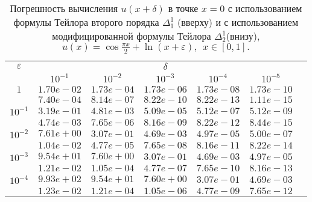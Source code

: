 \documentclass[10pt,twoside]{uz_kgu}
\begin{document}
\newpage
\begin{table} [!htb]
		\caption {Погрешность вычисления $u(x+ \delta)$ в точке $x=0$ с использованием формулы Тейлора второго порядка $\Delta_1^1$ (вверху) и с использованием модифицированной формулы Тейлора $\Delta_2^1$(внизу),
		$u(x)=  \cos \frac{\pi x}{2} + \ln{(x+\varepsilon)} ,\ \    x\in [0,1].$}
	\begin{center}
		\begin{tabular}{|c|c|c|c|c|c|c}
			\cline{1-6} $\varepsilon$ & \multicolumn{5}{c|}{$\delta$} \\
			\cline{2-6} &$10^{-1}$ & $10^{-2}$ & $10^{-3}$  & $10^{-4}$& $10^{-5}$\\
			\cline{1-6}
			$1$
			&$1.70e-02$&$1.73e-04$&$1.73e-06$&$1.73e-08$& $1.73e-10$\\
			&$7.40e-04$&$8.14e-07$&$8.22e-10$&$8.22e-13$& $1.11e-15$\\
			\cline{1-6}
			$10^{-1}$
			&$3.19e-01$&$4.81e-03$&$5.09e-05$&$5.12e-07$&$5.12e-09$\\
			&$4.74e-03$&$7.65e-06$&$8.16e-09$&$8.22e-12$&$8.44e-15$\\
			\cline{1-6}
			$10^{-2}$
			&$7.61e+00$&$3.07e-01$&$4.69e-03$&$4.97e-05$&$5.00e-07$\\
			&$1.04e-02$&$4.77e-05$&$7.65e-08$&$8.16e-11$&$8.22e-14$\\
			\cline{1-6}
			$10^{-3}$
			&$9.54e+01$&$7.60e+00$&$3.07e-01$&$4.69e-03$&$4.97e-05$\\
			&$1.21e-02$&$1.05e-04$&$4.77e-07$&$7.65e-10$&$8.16e-13$\\
			\cline{1-6}
			$10^{-4}$
			&$9.93e+02$&$9.54e+01$&$7.60e+00$&$3.07e-01$&$4.69e-03$\\
			&$1.23e-02$&$1.21e-04$&$1.05e-06$&$4.77e-09$&$7.65e-12$\\
			\cline{1-6}
		\end{tabular}
	\end{center}
\end{table}
\end{document}
